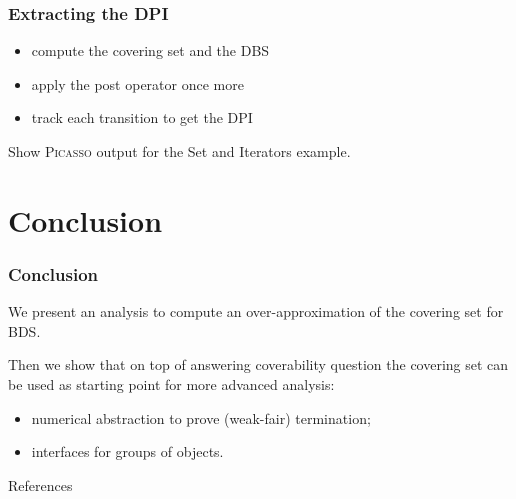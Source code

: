 \documentclass{beamer}
\newcommand{\picasso}{\textsc{Picasso}\xspace}
\begin{document}
\begin{frame}
  \frametitle{Extracting the DPI}
  \begin{itemize}
  \item compute the covering set and the DBS
  \item apply the post operator once more
  \item track each transition to get the DPI
  \end{itemize}

  \vspace{2ex}

  Show \picasso output for the Set and Iterators example.
\end{frame}

\section*{Conclusion}

\begin{frame}
  \frametitle{Conclusion}

  We present an analysis to compute an over-approximation of the covering set for BDS.

  Then we show that on top of answering coverability question the covering set can be used as starting point for more advanced analysis:
  \begin{itemize}
  \item numerical abstraction to prove (weak-fair) termination;
  \item interfaces for groups of objects.
  \end{itemize}

\end{frame}


\begin{frame}[allowframebreaks]{References}
  \frametitle{}
  {\tiny
  
  
  }
\end{frame}
\end{document}
